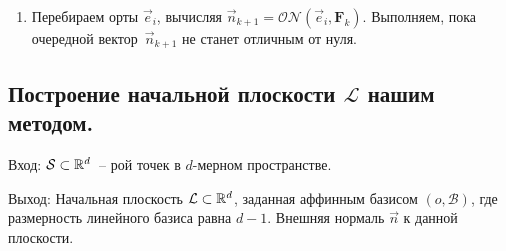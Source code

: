 \documentclass[a4paper,12pt]{article}
\newcommand{\R}[1][]{%
  \ifthenelse{\equal{#1}{}}%
  {\mathbb{R}}%
  {\mathbb{R}^{#1}}}
\newcommand{\Swarm}{\mathcal{S}}              %
\newcommand{\Basis}{\mathcal{B}}              %
\newcommand{\ONorm}[3][]{\mathcal{ON}#1( #2, #3 #1)} %
\newcommand{\FinalVec}{\mathbf{F}} %
\newcommand{\Plane}{\mathcal{L}}           %
\renewcommand{\.}{\hspace{0.2ex}}
\begin{document}
    \begin{enumerate}
      \item Перебираем орты $\vec e_i$, вычисляя $\vec n_{k+1} = \ONorm{\vec e_i}{\FinalVec_k}$. Выполняем, пока очередной вектор~$\vec n_{k+1}$ не станет отличным от нуля.
    \end{enumerate}

  \subsection{Построение начальной плоскости $\Plane$ нашим методом.}
    \label{InitialPlaneOur}

    Вход: $\Swarm \subset \R[d]$~-- рой точек в $d$-мерном пространстве.

    Выход: Начальная плоскость $\Plane \subset \R[d]$, заданная аффинным базисом $(o,\Basis)$, где размерность линейного базиса равна $d-1$. Внешняя нормаль $\vec n$ к данной плоскости.
\end{document}
